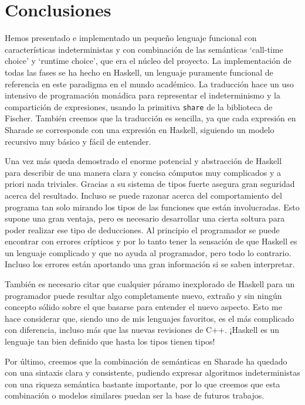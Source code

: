 \documentclass[class=article, crop=false]{standalone}
\begin{document}
\section{Conclusiones}
Hemos presentado e implementado un pequeño lenguaje funcional con características
indeterministas y con combinación de las semánticas `call-time choice' y `runtime choice',
que era el núcleo del proyecto. La implementación de todas las fases se ha hecho en Haskell,
un lenguaje puramente funcional de referencia en este paradigma en el mundo académico. La
traducción hace un uso intensivo de programación monádica para representar el indeterminismo
y la compartición de expresiones, usando la primitiva \verb`share` de la biblioteca de
Fischer. También creemos que la traducción es sencilla, ya que cada expresión en Sharade se
corresponde con una expresión en Haskell, siguiendo un modelo recursivo muy básico y fácil de
entender.

Una vez más queda demostrado el enorme potencial y abstracción de Haskell para describir de
una manera clara y concisa cómputos muy complicados y a priori nada triviales. Gracias a su
sistema de tipos fuerte asegura gran seguridad acerca del resultado. Incluso se puede razonar
acerca del comportamiento del programa tan solo mirando los tipos de las funciones que están
involucradas. Esto supone una gran ventaja, pero es necesario desarrollar una cierta soltura
para poder realizar ese tipo de deducciones. Al principio el programador se puede encontrar
con errores crípticos y por lo tanto tener la sensación de que Haskell es un lenguaje
complicado y que no ayuda al programador, pero todo lo contrario. Incluso los errores están
aportando una gran información si se saben interpretar.

También es necesario citar que cualquier páramo inexplorado de Haskell para un programador
puede resultar algo completamente nuevo, extraño y sin ningún concepto sólido sobre el que
basarse para entender el nuevo aspecto. Esto me hace considerar que, siendo uno de mis
lenguajes favoritos, es el más complicado con diferencia, incluso más que las nuevas
revisiones de C++. ¡Haskell es un lenguaje tan bien definido que hasta los tipos tienen
tipos!

Por último, creemos que la combinación de semánticas en Sharade ha quedado con una sintaxis
clara y consistente, pudiendo expresar algoritmos indeterministas con una riqueza semántica
bastante importante, por lo que creemos que esta combinación o modelos similares puedan ser
la base de futuros trabajos.
\end{document}
